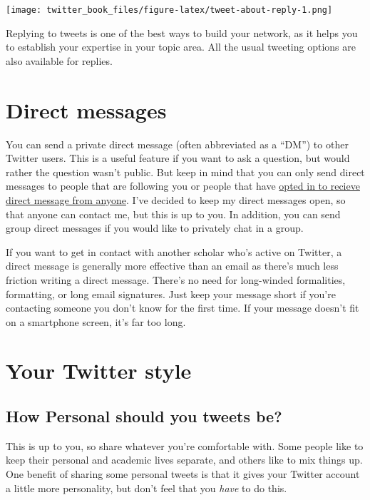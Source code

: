 \documentclass[
]{book}
\begin{document}
\texttt{[image: twitter\_book\_files/figure-latex/tweet-about-reply-1.png]}

Replying to tweets is one of the best ways to build your network, as it helps you to establish your expertise in your topic area. All the usual tweeting options are also available for replies.

\hypertarget{direct-messages}{%
\section*{Direct messages}\label{direct-messages}}

You can send a private direct message (often abbreviated as a ``DM'') to other Twitter users. This is a useful feature if you want to ask a question, but would rather the question wasn't public. But keep in mind that you can only send direct messages to people that are following you or people that have \href{https://help.twitter.com/en/using-twitter/direct-messages\#receive}{opted in to recieve direct message from anyone}. I've decided to keep my direct messages open, so that anyone can contact me, but this is up to you. In addition, you can send group direct messages if you would like to privately chat in a group.

If you want to get in contact with another scholar who's active on Twitter, a direct message is generally more effective than an email as there's much less friction writing a direct message. There's no need for long-winded formalities, formatting, or long email signatures. Just keep your message short if you're contacting someone you don't know for the first time. If your message doesn't fit on a smartphone screen, it's far too long.

\hypertarget{your-twitter-style}{%
\section*{Your Twitter style}\label{your-twitter-style}}

\hypertarget{how-personal-should-you-tweets-be}{%
\subsection{How Personal should you tweets be?}\label{how-personal-should-you-tweets-be}}

This is up to you, so share whatever you're comfortable with. Some people like to keep their personal and academic lives separate, and others like to mix things up. One benefit of sharing some personal tweets is that it gives your Twitter account a little more personality, but don't feel that you \emph{have} to do this.
\end{document}
